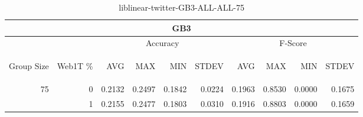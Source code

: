 \begin{center}
\begin{table}[htbp]
\begin{tabular}{ | r | r | r | r | r | r | r | r | r | r |}
\hline
\multicolumn{10}{|c|}{GB3}\\
\hline
 & & \multicolumn{4}{|c|}{Accuracy} & \multicolumn{4}{|c|}{F-Score}\\ \cline{3-10}
\begin{sideways}Group Size\end{sideways} & \begin{sideways}Web1T \%\end{sideways} & \begin{sideways}AVG\end{sideways} & \begin{sideways}MAX\end{sideways} & \begin{sideways}MIN\end{sideways} & \begin{sideways}STDEV\end{sideways} & \begin{sideways}AVG\end{sideways} & \begin{sideways}MAX\end{sideways} & \begin{sideways}MIN\end{sideways} & \begin{sideways}STDEV\end{sideways}\\
\hline
\multirow{1}{*}{75}
 & 0 & 0.2132 & 0.2497 & 0.1842 & 0.0224 & 0.1963 & 0.8530 & 0.0000 & 0.1675\\ \cline{2-10}
 & 1 & 0.2155 & 0.2477 & 0.1803 & 0.0310 & 0.1916 & 0.8803 & 0.0000 & 0.1659\\ \cline{2-10}
\hline
\end{tabular}
\caption{liblinear-twitter-GB3-ALL-ALL-75}
\label{table:liblinear-twitter-GB3-ALL-ALL-75}
\end{table}
\end{center}

